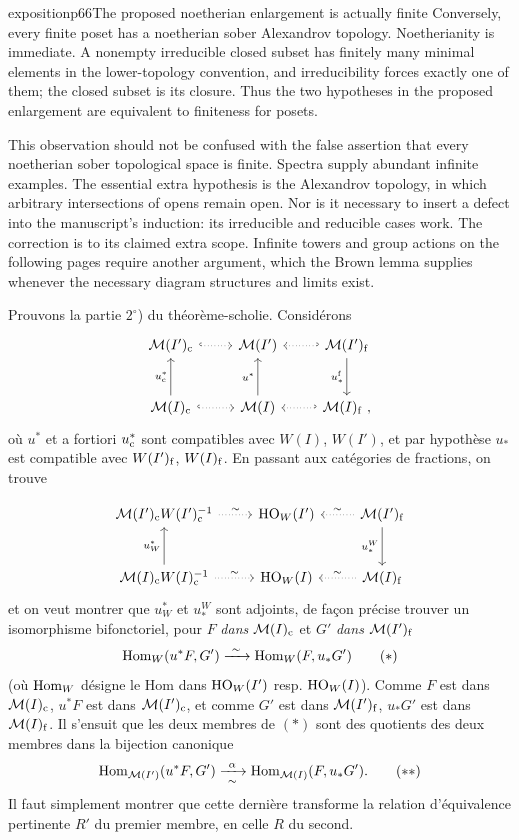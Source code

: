 \begin{dcomment}{exposition}{p66}{The proposed noetherian enlargement is actually finite}
Conversely, every finite poset has a noetherian sober Alexandrov topology. Noetherianity is immediate. A nonempty irreducible closed subset has finitely many minimal elements in the lower-topology convention, and irreducibility forces exactly one of them; the closed subset is its closure. Thus the two hypotheses in the proposed enlargement are equivalent to finiteness for posets.

This observation should not be confused with the false assertion that every noetherian sober topological space is finite. Spectra supply abundant infinite examples. The essential extra hypothesis is the Alexandrov topology, in which arbitrary intersections of opens remain open. Nor is it necessary to insert a defect into the manuscript's induction: its irreducible and reducible cases work. The correction is to its claimed extra scope. Infinite towers and group actions on the following pages require another argument, which the Brown lemma supplies whenever the necessary diagram structures and limits exist.
\end{dcomment}


Prouvons la partie $2^\circ$) du théorème-scholie. Considérons
\[
\begin{tikzcd}[row sep=large]
\cM(I')_{\rc} \arrow[r, hook, dotted] & \cM(I') & \cM(I')_{\rf} \arrow[l, hook', dotted] \arrow[d, "u_*^{\rf}"'] \\
\cM(I)_{\rc} \arrow[r, hook, dotted] \arrow[u, "u_{\rc}^*"] & \cM(I) \arrow[u, "u^*"] & \cM(I)_{\rf} \ , \arrow[l, hook', dotted]
\end{tikzcd}
\]
où $u^*$ et a fortiori $u_{\mathrm{c}}^*$ sont compatibles avec $W(I)$, $W(I')$, et par hypothèse $u_*$ est compatible avec $W(I')_{\mathrm{f}}$, $W(I)_{\mathrm{f}}$. En passant aux catégories de fractions, on trouve

\[
\begin{tikzcd}[row sep=large]
\cM(I')_{\rc}W(I')_{\rc}^{-1} \arrow[r, dotted, "\sim"] & \HO_W(I') & \cM(I')_{\rf} \arrow[l, dotted, "\sim"'] \arrow[d, "u_*^W"'] \\
\cM(I)_{\rc}W(I)_{\rc}^{-1} \arrow[r, dotted, "\sim"] \arrow[u, "u_W^*"] & \HO_W(I) & \cM(I)_{\rf} \arrow[l, dotted, "\sim"']
\end{tikzcd}
\]
 et on veut montrer que $u_W^*$ et $u_*^W$ sont adjoints, de façon précise trouver un isomorphisme bifonctoriel, pour $F$ \textit{dans} $\mathcal{M}(I)_{\mathrm{c}}$ et $G'$ \textit{dans} $\mathcal{M}(I')_{\mathrm{f}}$
\[
\mathrm{Hom}_W(u^*F, G') \xrightarrow{\ \sim\ } \mathrm{Hom}_W(F, u_*G') \tag*{$(*)$}
\]
(où $\mathrm{Hom}_W$ désigne le Hom dans $\mathrm{HO}_W(I')$ resp. $\mathrm{HO}_W(I)$). Comme $F$ est dans $\mathcal{M}(I)_{\mathrm{c}}$, $u^*F$ est dans $\mathcal{M}(I')_{\mathrm{c}}$, et comme $G'$ est dans $\mathcal{M}(I')_{\mathrm{f}}$, $u_*G'$ est dans $\mathcal{M}(I)_{\mathrm{f}}$. Il s'ensuit que les deux membres de $(*)$ sont des quotients des deux membres dans la bijection canonique
\[
\Hom_{\cM(I')}(u^*F, G') \xrightarrow[\ \sim\ ]{\alpha} \Hom_{\cM(I)}(F, u_*G'). \tag*{$(**)$}
\]
Il faut simplement montrer que cette dernière transforme la relation d'équivalence pertinente $R'$ du premier membre,
en celle $R$ du second.

